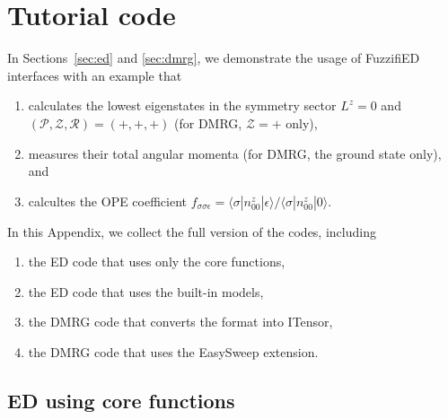 \documentclass{timesjhep}
\begin{document}
\section{Tutorial code}
\label{app:code}

In Sections~\ref{sec:ed} and \ref{sec:dmrg}, we demonstrate the usage of FuzzifiED interfaces with an example that 
\begin{enumerate}
    \item calculates the lowest eigenstates in the symmetry sector $L^z=0$ and $(\mathcal{P},\mathcal{Z},\mathcal{R})=(+,+,+)$ (for DMRG, $\mathcal{Z}=+$ only),
    \item measures their total angular momenta (for DMRG, the ground state only), and 
    \item calcultes the OPE coefficient $f_{\sigma\sigma\epsilon}=\langle \sigma|n^z_{00}|\epsilon\rangle/\langle \sigma|n^z_{00}|0\rangle$.
\end{enumerate}
In this Appendix, we collect the full version of the codes, including
\begin{enumerate}
    \item the ED code that uses only the core functions, 
    \item the ED code that uses the built-in models, 
    \item the DMRG code that converts the format into ITensor, 
    \item the DMRG code that uses the EasySweep extension. 
\end{enumerate}

\subsection{ED using core functions}
\label{app:code_ed1}
\end{document}
